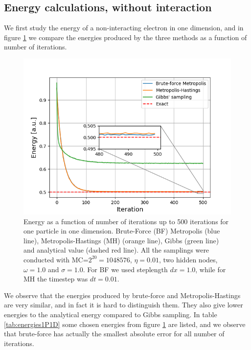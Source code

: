\documentclass[norsk,a4paper,12pt]{article}
\begin{document}
\subsection{Energy calculations, without interaction}
We first study the energy of a non-interacting electron in one dimension, and in figure \ref{fig:energy1P1D} we compare the energies produced by the three methods as a function of number of iterations. 
 \begin{figure} [H]
 	\centering
 	\includegraphics[scale=0.8]{plots/energy_comparison.png}
 	\caption{Energy as a function of number of iterations up to 500 iterations for one particle in one dimension. Brute-Force (BF) Metropolis (blue line), Metropolis-Hastings (MH) (orange line), Gibbs (green line) and analytical value (dashed red line). All the samplings were conducted with MC=$2^{20}=1048576$, $\eta=0.01$, two hidden nodes, $\omega=1.0$ and $\sigma=1.0$. For BF we used steplength $dx=1.0$, while for MH the timestep was $dt=0.01$.}
 	\label{fig:energy1P1D}
 \end{figure}
We observe that the energies produced by brute-force and Metropolis-Hastings are very similar, and in fact it is hard to distinguish them. They also give lower energies to the analytical energy compared to Gibbs sampling. In table \ref{tab:energies1P1D} some chosen energies from figure \ref{fig:energy1P1D} are listed, and we observe that brute-force has actually the smallest absolute error for all number of iterations. 
\end{document}
